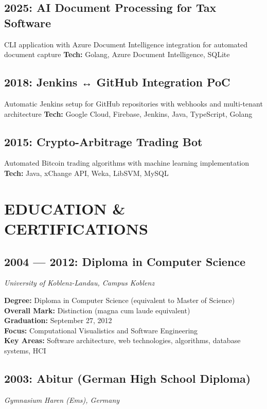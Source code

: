 \documentclass[10pt,a4paper]{article}
\begin{document}
\subsection{2025: AI Document Processing for Tax Software}
CLI application with Azure Document Intelligence integration for automated document capture
\textbf{Tech:} Golang, Azure Document Intelligence, SQLite

\subsection{2018: Jenkins ↔ GitHub Integration PoC}
Automatic Jenkins setup for GitHub repositories with webhooks and multi-tenant architecture
\textbf{Tech:} Google Cloud, Firebase, Jenkins, Java, TypeScript, Golang

\subsection{2015: Crypto-Arbitrage Trading Bot}
Automated Bitcoin trading algorithms with machine learning implementation
\textbf{Tech:} Java, xChange API, Weka, LibSVM, MySQL

\newpage

\section{EDUCATION \& CERTIFICATIONS}

\subsection{2004 — 2012: Diploma in Computer Science}
\textit{University of Koblenz-Landau, Campus Koblenz}

\textbf{Degree:} Diploma in Computer Science (equivalent to Master of Science)\\
\textbf{Overall Mark:} Distinction (magna cum laude equivalent)\\
\textbf{Graduation:} September 27, 2012\\
\textbf{Focus:} Computational Visualistics and Software Engineering\\
\textbf{Key Areas:} Software architecture, web technologies, algorithms, database systems, HCI

\subsection{2003: Abitur (German High School Diploma)}
\textit{Gymnasium Haren (Ems), Germany}
\end{document}
